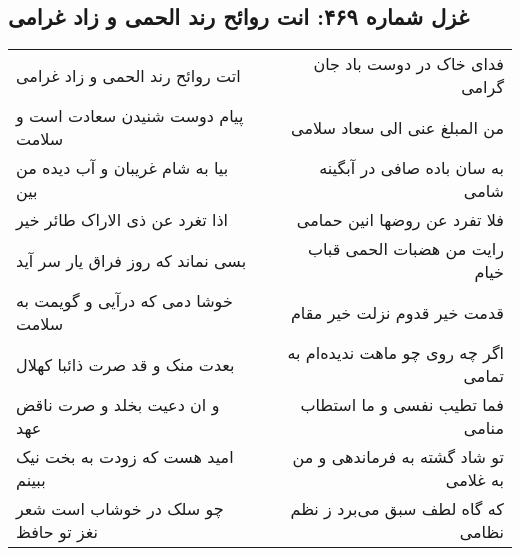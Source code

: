 \begin{center}
\section*{غزل شماره ۴۶۹: انت روائح رند الحمی و زاد غرامی}
\label{sec:sh469}
\begin{longtable}{l p{0.5cm} r}
اتت روائح رند الحمی و زاد غرامی
&&
فدای خاک در دوست باد جان گرامی
\\
پیام دوست شنیدن سعادت است و سلامت
&&
من المبلغ عنی الی سعاد سلامی
\\
بیا به شام غریبان و آب دیده من بین
&&
به سان باده صافی در آبگینه شامی
\\
اذا تغرد عن ذی الاراک طائر خیر
&&
فلا تفرد عن روضها انین حمامی
\\
بسی نماند که روز فراق یار سر آید
&&
رایت من هضبات الحمی قباب خیام
\\
خوشا دمی که درآیی و گویمت به سلامت
&&
قدمت خیر قدوم نزلت خیر مقام
\\
بعدت منک و قد صرت ذائبا کهلال
&&
اگر چه روی چو ماهت ندیده‌ام به تمامی
\\
و ان دعیت بخلد و صرت ناقض عهد
&&
فما تطیب نفسی و ما استطاب منامی
\\
امید هست که زودت به بخت نیک ببینم
&&
تو شاد گشته به فرماندهی و من به غلامی
\\
چو سلک در خوشاب است شعر نغز تو حافظ
&&
که گاه لطف سبق می‌برد ز نظم نظامی
\\
\end{longtable}
\end{center}
